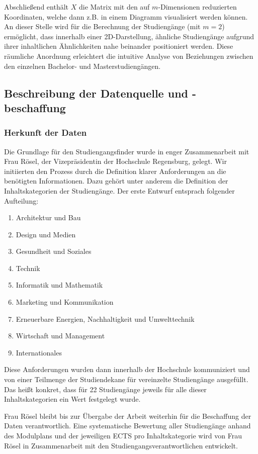Abschließend enthält $ X $ die Matrix mit den auf $ m $-Dimensionen reduzierten
Koordinaten, welche dann z.B. in einem Diagramm visualisiert werden können.
An dieser Stelle wird für die Berechnung der Studiengänge (mit $ m = 2 $)
ermöglicht, dass innerhalb einer 2D-Darstellung, ähnliche Studiengänge aufgrund
ihrer inhaltlichen Ähnlichkeiten nahe beinander positioniert werden. Diese
räumliche Anordnung erleichtert die intuitive Analyse von Beziehungen zwischen
den einzelnen Bachelor- und Masterstudiengängen.

\subsection{Beschreibung der Datenquelle und -beschaffung}
\subsubsection{Herkunft der Daten}\label{sec:herkunft-der-daten}
Die Grundlage für den Studiengangsfinder wurde in enger Zusammenarbeit mit Frau
Rösel, der Vizepräsidentin der Hochschule Regensburg, gelegt. Wir initiierten
den Prozess durch die Definition klarer Anforderungen an die benötigten
Informationen. Dazu gehört unter anderem die Definition der Inhaltskategorien
der Studiengänge. Der erste Entwurf entsprach folgender Aufteilung:

\begin{enumerate}
    \item Architektur und Bau
    \item Design und Medien
    \item Gesundheit und Soziales
    \item Technik
    \item Informatik und Mathematik
    \item Marketing und Kommunikation
    \item Erneuerbare Energien, Nachhaltigkeit und Umwelttechnik
    \item Wirtschaft und Management
    \item Internationales
\end{enumerate}

Diese Anforderungen wurden dann innerhalb der Hochschule kommuniziert und von
einer Teilmenge der Studiendekane für vereinzelte Studiengänge ausgefüllt. Das
heißt konkret, dass für 22 Studiengänge jeweils für alle dieser
Inhaltskategorien ein Wert festgelegt wurde.

Frau Rösel bleibt bis zur Übergabe der Arbeit weiterhin für die Beschaffung der Daten verantwortlich. Eine systematische Bewertung aller Studiengänge anhand des Modulplans und der jeweiligen ECTS pro Inhaltskategorie wird von Frau Rösel in Zusammenarbeit mit den Studiengangsverantwortlichen entwickelt.

